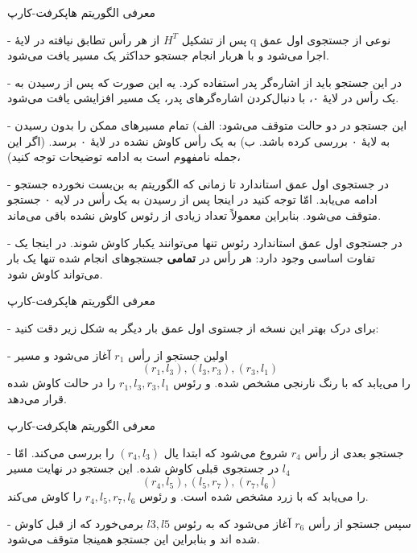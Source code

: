\begin{itemframe}{‌معرفی الگوریتم هاپکرفت-کارپ}
\decLineSpace[1mm]
\item[-]
پس از تشکیل  $H^T$ از هر رأس تطابق نیافته در لایهٔ q نوعی از جستجوی اول عمق اجرا می‌شود و با هربار انجام جستجو حداکثر یک مسیر یافت می‌شود.
\item[-]
در این جستجو باید از اشاره‌گر پدر استفاده کرد. یه این صورت که پس از رسیدن به یک رأس در لایهٔ ۰، با دنبال‌کردن ‌اشاره‌گرهای پدر، یک مسیر افزایشی یافت می‌شود.

\item[-]
این جستجو در دو حالت متوقف می‌شود:
الف) تمام مسیرهای ممکن را بدون رسیدن به لایهٔ ۰ بررسی کرده باشد.
ب) به یک رأس کاوش نشده در لایهٔ ۰ برسد. (اگر این جمله نامفهوم است به ادامه توضیحات توجه کنید)،

\item[-]
در جستجوی اول عمق استاندارد تا زمانی که الگوریتم به بن‌بست نخورده جستجو ادامه می‌یابد. امّا توجه کنید در اینجا پس از رسیدن به یک رأس در لایه ۰ جستجو متوقف می‌شود. بنابراین معمولاً تعداد زیادی از رئوس کاوش نشده باقی می‌ماند.
\item[-]
در جستجوی اول عمق استاندارد رئوس تنها می‌توانند یکبار کاوش شوند. در اینجا یک تفاوت اساسی وجود دارد: هر رأس در \textbf{تمامی} جستجوهای انجام شده تنها یک بار می‌تواند کاوش شود.
\end{itemframe}


\begin{itemframe}{‌معرفی الگوریتم هاپکرفت-کارپ}
\item[-]
برای درک بهتر این نسخه از جستوی اول عمق بار دیگر به شکل زیر دقت کنید:
\item[-]
اولین جستجو از رأس
$r_1$
آغاز می‌شود و مسیر
$$ (r_1, l_3), (l_3, r_3), (r_3, l_1) $$
را می‌یابد که با رنگ نارنجی مشخص شده. و رئوس
$r_1, l_3, r_3, l_1$
را در حالت کاوش شده قرار می‌دهد.
\end{itemframe}


\begin{itemframe}{‌معرفی الگوریتم هاپکرفت-کارپ}
\item[-]
 جستجو بعدی از رأس
$r_4$
شروع می‌شود که ابتدا یال
$(r_4, l_3)$
را بررسی می‌کند. امّا
$l_4$
در جستجوی قبلی کاوش شده. این جستجو در نهایت مسیر
$$(r_4, l_5), (l_5, r_7), (r_7, l_6)$$
را می‌یابد که با زرد مشخص شده است. و رئوس
$r_4, l_5, r_7, l_6$
را کاوش می‌کند.
\item[-]
سپس جستجو از رأس
$r_6$
آغاز می‌شود که به رئوس
$l3, l5$
برمی‌خورد که از قبل کاوش شده اند و بنابراین این جستجو همینجا متوقف می‌شود.
\end{itemframe}


